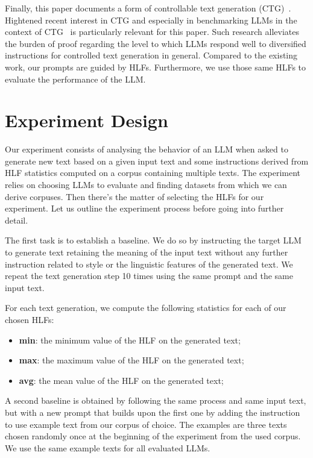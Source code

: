 \documentclass[11pt]{article}
\begin{document}
Finally, this paper documents a form of controllable text generation
(CTG)~\cite{zhang-ctg-2022}.
Hightened recent interest in CTG and especially in benchmarking LLMs in the
context of CTG~\cite{chen2024benchmarking} is particularly relevant for this
paper.
Such research alleviates the burden of proof regarding the level to which
LLMs respond well to diversified instructions for controlled text generation in
general.
Compared to the existing work, our prompts are guided by HLFs.
Furthermore, we use those same HLFs to evaluate the performance of the LLM.

\section{Experiment Design}\label{method}

Our experiment consists of analysing the behavior of an LLM when asked to
generate new text based on a given input text and some instructions derived from
HLF statistics computed on a corpus containing multiple texts.
The experiment relies on choosing LLMs to evaluate and finding datasets from
which we can derive corpuses.
Then there's the matter of selecting the HLFs for our experiment.
Let us outline the experiment process before going into further detail.

The first task is to establish a baseline.
We do so by instructing the target LLM to generate text retaining the meaning of
the input text without any further instruction related to style or the
linguistic features of the generated text.
We repeat the text generation step 10 times using the same prompt and the same
input text.

For each text generation, we compute the following statistics for each of our
chosen HLFs:

\begin{itemize}
    \item \textbf{min}: the minimum value of the HLF on the generated text;
    \item \textbf{max}: the maximum value of the HLF on the generated text;
    \item \textbf{avg}: the mean value of the HLF on the generated text;
\end{itemize}

A second baseline is obtained by following the same process and same input text,
but with a new prompt that builds upon the first one by adding the instruction
to use example text from our corpus of choice.
The examples are three texts chosen randomly once at the beginning of the
experiment from the used corpus.
We use the same example texts for all evaluated LLMs.
\end{document}
